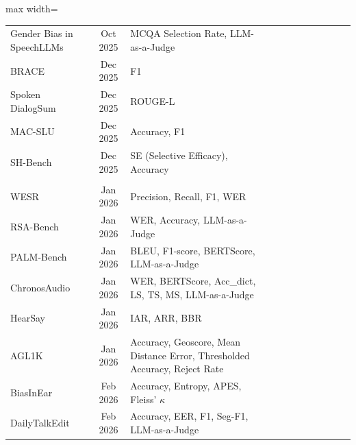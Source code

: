 \documentclass{llmxive}
\makeatletter
\providecommand{\cmark}{\ding{51}}
\providecommand{\xmark}{\ding{55}}
\providecommand{\YearRow}[1]{    \addlinespace[0.45em]
    \rowcolor{gray!12}
    \multicolumn{\TableCols}{@{}l@{}}{\hspace{0.4em}\textbf{\textit{#1}}} \\
    \addlinespace[0.15em]
}
\providecommand{\TableCols}{14}
\makeatother
\begin{document}
\begin{table}[htbp]
\begin{adjustbox}{max width=\textwidth}
\begin{tabular}{@{}lclccccccccc@{}}
Gender Bias in SpeechLLMs\cite{satish2025bias}
                      & Oct 2025 & MCQA Selection Rate, LLM-as-a-Judge & \xmark & \xmark & \xmark & \xmark & \xmark & \xmark & \xmark & \xmark & \cmark \\
BRACE\cite{guo2025brace}                & Dec 2025 & F1 & \cmark & \xmark & \xmark & \cmark & \xmark & \xmark & \xmark & \xmark & \xmark \\
Spoken DialogSum\cite{lu2025spoken}      & Dec 2025 & ROUGE-L & \xmark & \xmark & \cmark & \xmark & \xmark & \xmark & \xmark & \xmark & \xmark \\
MAC-SLU\cite{peng2025mac}               & Dec 2025 & Accuracy, F1 & \cmark & \xmark & \xmark & \xmark & \xmark & \xmark & \xmark & \xmark & \xmark \\
SH-Bench\cite{zhan2025protecting}      & Dec 2025 & SE (Selective Efficacy), Accuracy & \cmark & \xmark & \xmark & \xmark & \cmark & \xmark & \xmark & \xmark & \xmark \\
\midrule
\YearRow{Year 2026}
WESR\cite{yang2026wesr}                  & Jan 2026 & Precision, Recall, F1, WER & \cmark & \xmark & \xmark & \xmark & \xmark & \xmark & \xmark & \xmark & \xmark \\
RSA-Bench\cite{zhang2026rsa}             & Jan 2026 & WER, Accuracy, LLM-as-a-Judge & \cmark & \cmark & \xmark & \xmark & \xmark & \xmark & \xmark & \cmark & \xmark \\
PALM-Bench\cite{wang2026palm}            & Jan 2026 & BLEU, F1-score, BERTScore, LLM-as-a-Judge & \xmark & \cmark & \cmark & \cmark & \xmark & \xmark & \xmark & \xmark & \xmark \\
ChronosAudio\cite{luo2026chronosaudio}          & Jan 2026 & WER, BERTScore, Acc\_dict, LS, TS, MS, LLM-as-a-Judge & \cmark & \cmark & \xmark & \cmark & \xmark & \xmark & \xmark & \xmark & \xmark \\
HearSay\cite{wang2026hearsay}               & Jan 2026 & IAR, ARR, BBR & \xmark & \xmark & \xmark & \xmark & \cmark & \xmark & \xmark & \xmark & \xmark \\
AGL1K\cite{zhang2026sonar}      & Jan 2026 & Accuracy, Geoscore, Mean Distance Error, Thresholded Accuracy, Reject Rate & \xmark & \cmark & \xmark & \xmark & \xmark & \xmark & \xmark & \xmark & \cmark \\
BiasInEar\cite{wei2026bias} & Feb 2026 & Accuracy, Entropy, APES, Fleiss' $\kappa$ & \xmark & \xmark & \xmark & \xmark & \xmark & \xmark & \xmark & \xmark & \cmark \\
DailyTalkEdit\cite{xu2026holiantispoof}           & Feb 2026 & Accuracy, EER, F1, Seg-F1, LLM-as-a-Judge & \xmark & \xmark & \xmark & \xmark & \xmark & \cmark & \xmark & \xmark & \xmark \\

\end{tabular}
\end{adjustbox}
\end{table}
\end{document}
